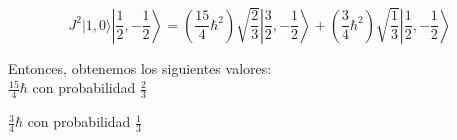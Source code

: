 \begin{solution}
\begin{parts}
  \[J^2|1,0\rangle \left|\frac{1}{2},-\frac{1}{2}\right\rangle =\left(\frac{15}{4}\hbar ^2\right)\sqrt{\frac{2}{3}}\left|\frac{3}{2},-\frac{1}{2}\right\rangle
  +\left(\frac{3}{4}\hbar ^2\right)\sqrt{\frac{1}{3}}\left|\frac{1}{2},-\frac{1}{2}\right\rangle\]
  
  Entonces, obtenemos los siguientes valores:\\
  
  \(\frac{15}{4}\hbar\) { }con probabilidad { }\(\frac{2}{3}\)
  
  \(\frac{3}{4}\hbar\) { }con probabilidad { }\(\frac{1}{3}\)
  
  \end{parts}
  \end{solution}
  